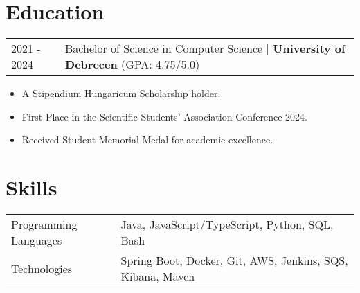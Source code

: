 \documentclass[a4paper,12pt]{article}
\begin{document}
\section{Education}
\begin{tabularx}{\linewidth}{@{}l X@{}}	
2021 - 2024 & Bachelor of Science in Computer Science | \textbf{University of Debrecen} \hfill (GPA: 4.75/5.0) \\ 
\end{tabularx}
\begin{itemize}[nosep,after=\strut, leftmargin=1em, itemsep=3pt,label=--]
\item A Stipendium Hungaricum Scholarship holder.
\item First Place in the Scientific Students' Association Conference 2024.
\item Received Student Memorial Medal for academic excellence.
\end{itemize}

\section{Skills}
\begin{tabularx}{\linewidth}{@{}l X@{}}
Programming Languages &  \normalsize{Java, JavaScript/TypeScript, Python, SQL, Bash}\\
Technologies  &  \normalsize{Spring Boot, Docker, Git, AWS, Jenkins, SQS, Kibana, Maven}\\  
\end{tabularx}

\end{document}
